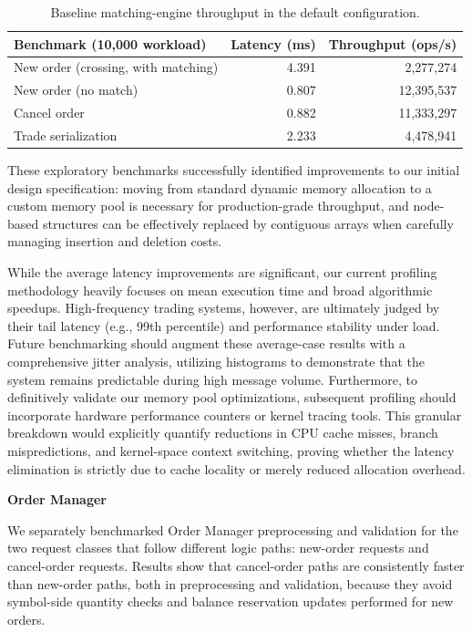 \documentclass[12pt,a4paper]{article}
\begin{document}
\begin{table}[H]
    \centering
    \renewcommand{\arraystretch}{1.2}
    \begin{tabular}{|l|r|r|}
        \hline
        \textbf{Benchmark (10,000 workload)} & \textbf{Latency (ms)} & \textbf{Throughput (ops/s)} \\
        \hline
        New order (crossing, with matching) & 4.391 & 2,277,274 \\
        New order (no match) & 0.807 & 12,395,537 \\
        Cancel order & 0.882 & 11,333,297 \\
        Trade serialization & 2.233 & 4,478,941 \\
        \hline
    \end{tabular}
    \caption{Baseline matching-engine throughput in the default configuration.}
    \label{tab:me_throughput}
\end{table}

These exploratory benchmarks successfully identified improvements to our initial design specification: moving from standard dynamic memory allocation to a custom memory pool is necessary for production-grade throughput, and node-based structures can be effectively replaced by contiguous arrays when carefully managing insertion and deletion costs.

While the average latency improvements are significant, our current profiling methodology heavily focuses on mean execution time and broad algorithmic speedups. High-frequency trading systems, however, are ultimately judged by their tail latency (e.g., 99th percentile) and performance stability under load. Future benchmarking should augment these average-case results with a comprehensive jitter analysis, utilizing histograms to demonstrate that the system remains predictable during high message volume. Furthermore, to definitively validate our memory pool optimizations, subsequent profiling should incorporate hardware performance counters or kernel tracing tools. This granular breakdown would explicitly quantify reductions in CPU cache misses, branch mispredictions, and kernel-space context switching, proving whether the latency elimination is strictly due to cache locality or merely reduced allocation overhead.

\noindent\textbf{Order Manager}

We separately benchmarked Order Manager preprocessing and validation for the two request classes that follow different logic paths: new-order requests and cancel-order requests. Results show that cancel-order paths are consistently faster than new-order paths, both in preprocessing and validation, because they avoid symbol-side quantity checks and balance reservation updates performed for new orders.
\end{document}
